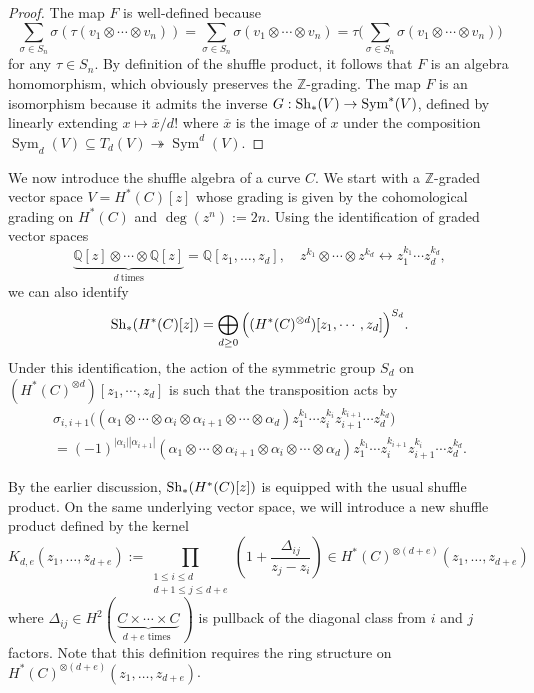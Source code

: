 \documentclass[10pt]{amsart}
\newcommand{\BZ}{\mathbb{Z}}
\newcommand{\BQ}{\mathbb{Q}}
\newcommand{\+}{{}^+}
\newcommand{\Sh}{\textnormal{Sh}}
\DeclareMathOperator{\Sym}{Sym}
\theoremstyle{definition}
\theoremstyle {definition}
\theoremstyle {definition}
\begin{document}
\begin{proof}
    The map $F$ is well-defined because
    $$\sum_{\sigma\in S_n}\sigma (\tau(v_1\otimes \cdots\otimes v_n))=\sum_{\sigma\in S_n}\sigma (v_1\otimes \cdots\otimes v_n)=\tau\Big(\sum_{\sigma\in S_n}\sigma (v_1\otimes \cdots\otimes v_n)\Big)
    $$
    for any $\tau\in S_n$. By definition of the shuffle product, it follows that $F$ is an algebra homomorphism, which obviously preserves the $\BZ$-grading. The map $F$ is an isomorphism because it admits the inverse $G:\Sh_*(V)\rightarrow\Sym^*(V)$, defined by linearly extending $x\mapsto \overline{x}/d!$ where $\overline{x}$ is the image of $x$ under the composition $\Sym_d(V)\subseteq T_d(V)\twoheadrightarrow \Sym^d(V)$.
    
\end{proof}

We now introduce the shuffle algebra of a curve $C$. We start with a $\BZ$-graded vector space $V = H^{*}(C)[z]$ whose grading is given by the cohomological grading on $H^{*}(C)$ and $\deg(z^n):=2n$. Using the identification of graded vector spaces 
$$\underbrace{\BQ[z]\otimes \cdots \otimes \BQ[z]}_{d \ \mathrm{times}}=\BQ[z_1,\dots,z_d],\quad z^{k_1}\otimes\cdots \otimes z^{k_d}\longleftrightarrow z_1^{k_1}\cdots z_d^{k_d},
$$
we can also identify
\begin{align} 
\Sh_*(H^{*}(C)[z]) = \bigoplus_{d \geq 0} \Big((H^{*}(C)^{\otimes d}) [z_1,\cdots,z_d]\Big)^{S_d}.
\end{align}  
Under this identification, the action of the symmetric group $S_d$ on $(H^{*}(C)^{\otimes d}) [z_1,\cdots,z_d]$ is such that the transposition acts by 
\begin{multline*}
    \sigma_{i,i+1}\Big((\alpha_1 \otimes \cdots \otimes\alpha_i \otimes \alpha_{i+1}\otimes 
    \cdots \otimes \alpha_d) z_{1}^{k_1} \cdots z_{i}^{k_i} z^{k_{i+1}}_{i+1}\cdots z_{d}^{k_d}\Big)\\
    = (-1)^{|\alpha_i||\alpha_{i+1}|} (\alpha_1 \otimes \cdots \otimes \alpha_{i+1} \otimes \alpha_{i}\otimes \cdots \otimes \alpha_d) z_{1}^{k_1} \cdots z_{i}^{k_{i+1}} z^{k_i}_{i+1}\cdots z_{d}^{k_d}.
\end{multline*}

By the earlier discussion, $\Sh_*(H^{*}(C)[z])$ is equipped with the usual shuffle product. On the same underlying vector space, we will introduce a new shuffle product defined by the kernel
\begin{equation}\label{eq: shuffle kernel}
    K_{d,e}(z_1,\dots,z_{d+e}):=\prod_{\substack{1 \leq i \leq d \\ d+1 \leq j \leq d+e}}\left(1+\frac{\Delta_{ij}}{z_j-z_i}\right)\in H^*(C)^{\otimes (d+e)}(z_1,\dots,z_{d+e})
\end{equation}
where $\Delta_{ij}\in H^2(\,\underbrace{C \times \cdots \times C}_{d+e \textrm{ times }}\,)$ is pullback of the diagonal class from $i$ and $j$ factors. Note that this definition requires the ring structure on $H^*(C)^{\otimes (d+e)}(z_1,\dots, z_{d+e})$.
\end{document}
